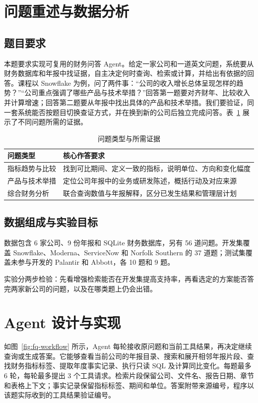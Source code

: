 \section{问题重述与数据分析}

\subsection{题目要求}
本题要求实现可复用的财务问答 Agent\cite{financeqacourse}。给定一家公司和一道英文问题，系统要从财务数据库和年报中找证据，自主决定何时查询、检索或计算，并给出有依据的回答。课程以 Snowflake 为例，问了两件事：“公司的收入增长总体呈现怎样的趋势？”“公司重点强调了哪些产品与技术举措？”回答第一题要对齐财年、比较收入并计算增速；回答第二题要从年报中找出具体的产品和技术举措。我们要验证，同一套系统能否按题目切换查证方式，并在换到新的公司后独立完成问答。表~\ref{tab:fq-question-types} 展示了不同问题所需的证据。

\begin{table}[ht]
\centering
\caption{问题类型与所需证据}
\label{tab:fq-question-types}
\begin{tabular}{@{}p{}p{}@{}}
\toprule
问题类型 & 核心作答要求\\
\midrule
指标趋势与比较 & 找到可比期间、定义一致的指标，说明单位、方向和变化幅度\\
产品与技术举措 & 定位公司年报中的业务或研发陈述，概括行动及对应来源\\
综合财务分析 & 联合查询数值与年报解释，区分已发生结果和管理层计划\\
\bottomrule
\end{tabular}
\end{table}

\subsection{数据组成与实验目标}
数据包含 6 家公司、9 份年报和 SQLite 财务数据库，另有 56 道问题。开发集覆盖 Snowflake、Moderna、ServiceNow 和 Norfolk Southern 的 37 道题；测试集覆盖未参与开发的 Palantir 和 Abbott，各 10 题和 9 题。

实验分两步检验：先看增强检索能否在开发集提高支持率，再看选定的方案能否答完两家新公司的问题，以及在哪类题上仍会出错。

\section{Agent 设计与实现}
如图~\ref{fig:fq-workflow} 所示，Agent 每轮接收原问题和当前工具结果，再决定继续查询或生成答案\cite{yao2023react}。它能够查看当前公司的年报目录、搜索和展开相邻年报片段、查找财务指标标签、提取年度事实记录、执行只读 SQL 及计算同比变化。每题最多 6 轮，每轮最多提出 3 个工具请求。检索片段保留公司、文件名、报告日期、章节和表格上下文；事实记录保留指标标签、期间和单位。答案附带来源编号，程序以该题实际收到的工具结果验证编号。

